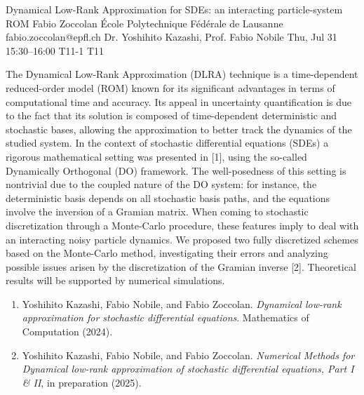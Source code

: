 \begin{talk}
  {Dynamical Low-Rank Approximation for SDEs: an interacting particle-system ROM}%
  {Fabio Zoccolan}%
  {\'Ecole Polytechnique F\'ed\'erale de Lausanne}%
  {fabio.zoccolan@epfl.ch}%
  {Dr. Yoshihito Kazashi, Prof. Fabio Nobile}%
  {}%
  {Thu, Jul 31 15:30--16:00}%
  {T11-1}%
  {T11}%
  
The Dynamical Low-Rank Approximation (DLRA) technique is a time-dependent reduced-order model (ROM) known for its significant advantages in terms of computational time and accuracy. Its appeal in uncertainty quantification is due to the fact that its solution is composed of time-dependent deterministic and stochastic bases, allowing the approximation to better track the dynamics of the studied system. In the context of stochastic differential equations (SDEs) a rigorous mathematical setting was presented in [1], using the so-called Dynamically Orthogonal (DO) framework. The well-posedness of this setting is nontrivial due to the coupled nature of the DO system: for instance, the deterministic basis depends on all stochastic basis paths, and the equations involve the inversion of a Gramian matrix. When coming to stochastic discretization through a Monte-Carlo procedure, these features imply to deal with an interacting noisy particle dynamics. We proposed two fully discretized schemes based on the Monte-Carlo method, investigating their errors and analyzing possible issues arisen by the discretization of the Gramian inverse [2]. Theoretical results will be supported by numerical simulations.

\medskip
\begin{enumerate}
 \item[{[1]}] Yoshihito Kazashi, Fabio Nobile, and Fabio Zoccolan. {\it Dynamical low-rank approximation for stochastic differential equations}. Mathematics of Computation (2024).
 \item[{[2]}] Yoshihito Kazashi, Fabio Nobile, and Fabio Zoccolan. {\it Numerical Methods for Dynamical low-rank approximation of stochastic differential equations, Part I \& II}, in preparation (2025).
\end{enumerate}

\end{talk}

